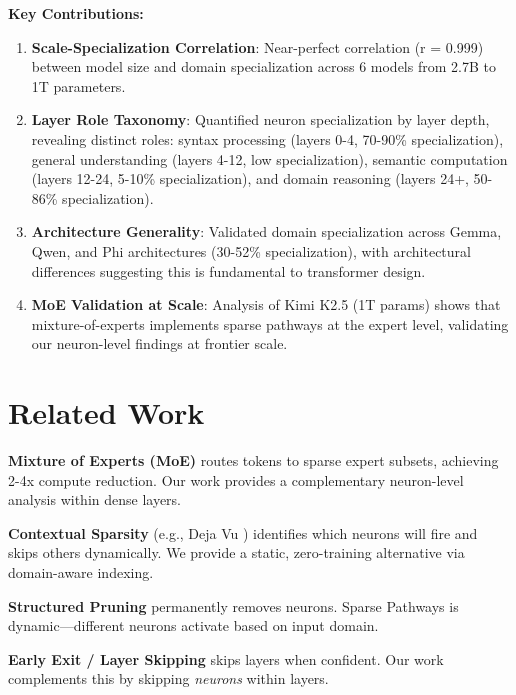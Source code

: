 \documentclass{article}
\begin{document}
\textbf{Key Contributions:}
\begin{enumerate}
    \item \textbf{Scale-Specialization Correlation}: Near-perfect correlation (r = 0.999) between model size and domain specialization across 6 models from 2.7B to 1T parameters.

    \item \textbf{Layer Role Taxonomy}: Quantified neuron specialization by layer depth, revealing distinct roles: syntax processing (layers 0-4, 70-90\% specialization), general understanding (layers 4-12, low specialization), semantic computation (layers 12-24, 5-10\% specialization), and domain reasoning (layers 24+, 50-86\% specialization).

    \item \textbf{Architecture Generality}: Validated domain specialization across Gemma, Qwen, and Phi architectures (30-52\% specialization), with architectural differences suggesting this is fundamental to transformer design.

    \item \textbf{MoE Validation at Scale}: Analysis of Kimi K2.5 (1T params) shows that mixture-of-experts implements sparse pathways at the expert level, validating our neuron-level findings at frontier scale.
\end{enumerate}

\section{Related Work}

\textbf{Mixture of Experts (MoE)} \cite{shazeer2017outrageously, fedus2022switch} routes tokens to sparse expert subsets, achieving 2-4x compute reduction. Our work provides a complementary neuron-level analysis within dense layers.

\textbf{Contextual Sparsity} (e.g., Deja Vu \cite{li2023lazy}) identifies which neurons will fire and skips others dynamically. We provide a static, zero-training alternative via domain-aware indexing.

\textbf{Structured Pruning} \cite{han2015deep, molchanov2019importance} permanently removes neurons. Sparse Pathways is dynamic---different neurons activate based on input domain.

\textbf{Early Exit / Layer Skipping} \cite{schuster2021confident} skips layers when confident. Our work complements this by skipping \textit{neurons} within layers.
\end{document}
